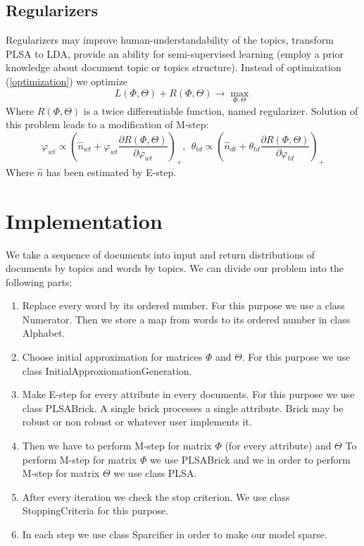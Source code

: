 \documentclass{article}
\begin{document}
        \subsection{Regularizers}
           Regularizers may improve human-understandability of the topics, transform PLSA to LDA, provide an ability 
           for semi-supervised learning (employ a prior knowledge about document topic or topics structure). 
           Instead of optimization (\ref{optimization}) we optimize
            \begin{equation} L(\Phi, \Theta) + R(\Phi, \Theta) \to \max_{\Phi, \Theta} \end{equation}
            Where $R(\Phi, \Theta)$ is a twice differentiable function, named regularizer. 
            Solution of this problem leads to a modification of M\--step:
            \begin{equation} 
                \varphi_{wt} \propto \left(\hat{n}_{wt} + \varphi_{wt} \frac{\partial  R(\Phi, \Theta)}{\partial \varphi_{wt}} \right)_+ ,\ \
                \theta_{td} \propto \left(\hat{n}_{dt} + \theta_{td}\frac{\partial  R(\Phi, \Theta)}{\partial \varphi_{td}} \right)_+
            \end{equation}
            Where $\hat{n}$ has been estimated by E\--step. 
    
    
    \section{Implementation}  
        We take a sequence of documents into input and return distributions of documents by topics and words by topics. We can divide our problem into the following parts: 
        \begin{enumerate}        
            \item Replace every word by its ordered number. For this purpose we use a class Numerator. Then we store a map from words to its ordered number in class Alphabet. 
            \item Choose initial approximation for matrices $\Phi$ and $\Theta$. For this purpose we use class InitialApproxiomationGeneration.
            \item Make E\--step for every attribute in every documents. For this purpose we use class PLSABrick. A single brick processes a single attribute.
                Brick may be robust or non robust or whatever user implements it. 
            \item Then we have to perform M\--step for matrix $\Phi$ (for every attribute) and $\Theta$
        		To perform M\--step for matrix $\Phi$ we use PLSABrick and we in order to perform M\--step for
        		matrix $\Theta$ we use class PLSA.
	        \item After every iteration we check the stop criterion. We use class StoppingCriteria for this purpose.
	        \item In each step we use class Sparcifier in order to make our model sparse. 
        \end{enumerate}
        
\end{document}
